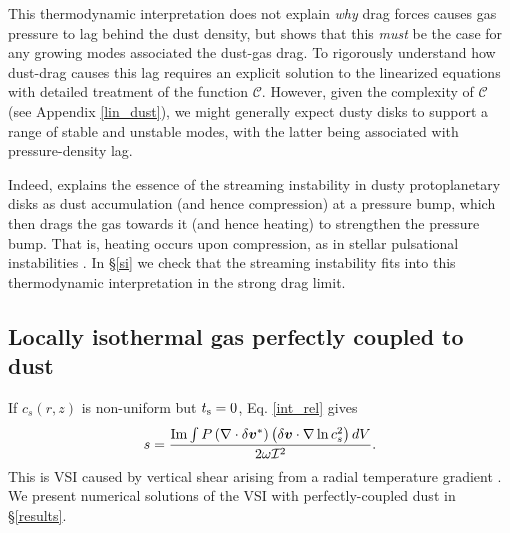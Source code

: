 
This thermodynamic interpretation does not explain 
\emph{why} drag forces causes gas pressure to lag behind the dust
density, but shows 
that this \emph{must} be the case for any growing modes associated the
dust-gas drag. To rigorously understand how dust-drag causes this 
lag requires an explicit solution to the linearized equations with 
detailed treatment of the function $\mathcal{C}$. However, given the complexity of
$\mathcal{C}$ (see Appendix \ref{lin_dust}), we might generally expect
 dusty disks to  support a range of stable and unstable modes, with the
latter being associated with pressure-density lag. 

Indeed, \cite{jacquet11} explains the essence of the streaming 
instability in dusty protoplanetary disks as dust accumulation
(and hence compression) at a pressure bump, which then drags the 
gas towards it (and hence heating) to strengthen the pressure
bump. That is, heating occurs upon compression, as in stellar  
pulsational instabilities \citep{cox67}. In \S\ref{si} we check that the
streaming instability fits into this thermodynamic interpretation in
the strong drag limit.  



\subsection{Locally isothermal gas perfectly coupled to dust}\label{dusty_vsi_int}
If $c_s(r,z)$ is non-uniform but $t_\mathrm{s}=0$, Eq. \ref{int_rel} 
gives  
\begin{align}
  s = \frac{\operatorname{Im}\int P
    \left(\nabla\cdot\delta\bm{v}^*\right)\left(\delta\bm{v}\cdot\nabla\ln{c_s^2}\right)dV}{2\omega\mathcal{I}^2}. \label{vsi_check} 
\end{align} 
This is VSI caused by vertical shear arising from a radial
temperature gradient \citep{nelson13,barker15,lin15}. We present 
numerical solutions of the VSI with perfectly-coupled dust in \S\ref{results}. 
